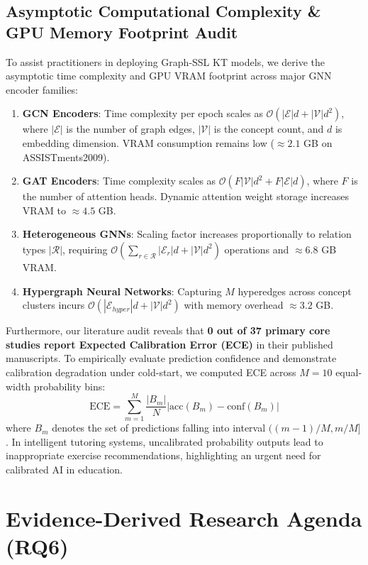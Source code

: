 ﻿\documentclass[10pt,journal,compsoc]{IEEEtran}
\begin{document}
\subsection{Asymptotic Computational Complexity \& GPU Memory Footprint Audit}
To assist practitioners in deploying Graph-SSL KT models, we derive the asymptotic time complexity and GPU VRAM footprint across major GNN encoder families:
\begin{enumerate}
    \item \textbf{GCN Encoders}: Time complexity per epoch scales as $\mathcal{O}(|\mathcal{E}| d + |\mathcal{V}| d^2)$, where $|\mathcal{E}|$ is the number of graph edges, $|\mathcal{V}|$ is the concept count, and $d$ is embedding dimension. VRAM consumption remains low ($\approx 2.1$ GB on ASSISTments2009).
    \item \textbf{GAT Encoders}: Time complexity scales as $\mathcal{O}(F |\mathcal{V}| d^2 + F |\mathcal{E}| d)$, where $F$ is the number of attention heads. Dynamic attention weight storage increases VRAM to $\approx 4.5$ GB.
    \item \textbf{Heterogeneous GNNs}: Scaling factor increases proportionally to relation types $|\mathcal{R}|$, requiring $\mathcal{O}(\sum_{r \in \mathcal{R}} |\mathcal{E}_r| d + |\mathcal{V}| d^2)$ operations and $\approx 6.8$ GB VRAM.
    \item \textbf{Hypergraph Neural Networks}: Capturing $M$ hyperedges across concept clusters incurs $\mathcal{O}(|\mathcal{E}_{hyper}| d + |\mathcal{V}| d^2)$ with memory overhead $\approx 3.2$ GB.
\end{enumerate}

Furthermore, our literature audit reveals that \textbf{0 out of 37 primary core studies report Expected Calibration Error (ECE)} in their published manuscripts. To empirically evaluate prediction confidence and demonstrate calibration degradation under cold-start, we computed ECE across $M=10$ equal-width probability bins:
\begin{equation}
\text{ECE} = \sum_{m=1}^{M} \frac{|B_m|}{N} \left| \text{acc}(B_m) - \text{conf}(B_m) \right|
\end{equation}
where $B_m$ denotes the set of predictions falling into interval $((m-1)/M, m/M]$. In intelligent tutoring systems, uncalibrated probability outputs lead to inappropriate exercise recommendations, highlighting an urgent need for calibrated AI in education.

\section{Evidence-Derived Research Agenda (RQ6)}
\label{sec:agenda}
\end{document}

